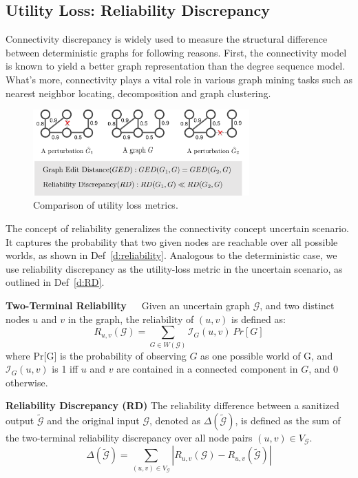 \subsection{Utility Loss: Reliability Discrepancy}

Connectivity discrepancy is widely used to measure the structural difference between deterministic graphs for following reasons. 
First, the connectivity model is known to yield a better graph representation than the degree sequence model. 
What's more, connectivity plays a vital role in various graph mining tasks such as nearest neighbor locating, decomposition and graph clustering. 
\begin{figure}[!htb]
  \centering
  \includegraphics[height=3.3cm]{ill/UL.pdf}
  \vspace{-4pt}
  \caption{Comparison of utility loss metrics.}
  \label{fig:utility_loss}
\end{figure} 

The concept of reliability generalizes the connectivity concept uncertain scenario. 
It captures the probability that two given nodes are reachable over all possible worlds, as shown in Def~\ref{d:reliability}. 
Analogous to the deterministic case, we use reliability discrepancy as the utility-loss metric in the uncertain scenario, as outlined in Def~\ref{d:RD}. 
\begin{definition}
    \textbf{Two-Terminal Reliability~\cite{Colbourn_Colbourn_1987}}~~Given an uncertain graph $\mathcal{G}$, and two distinct nodes $u$ and $v$ in the graph, the reliability of $(u,v)$ is defined as:
        \begin{equation*}
                R_{u,v}(\mathcal{G})= \sum_{G \in W(\mathcal{G})} \mathcal{I}_{G}(u,v) ~ Pr[G] 
        \end{equation*}
    where Pr[G] is the probability of observing $G$ as one possible world of G, and $\mathcal{I}_{G}(u,v)$ is 1 iff $u$ and $v$ are contained in a connected component in $G$, and 0 otherwise.   
    \label{d:reliability}
\end{definition}

\theoremstyle{definition}
\begin{definition}
    \textbf{Reliability Discrepancy (RD)}
    The reliability difference between a sanitized output $\tilde{\mathcal{G}}$ and the original input $\mathcal{G}$, 
    denoted as $\Delta(\tilde{\mathcal{G}})$, 
    is defined as the sum of the two-terminal reliability discrepancy over all node pairs $(u,v) \in V_\mathcal{G}$.
    \begin{equation*}
        \Delta(\tilde{\mathcal{G}})=\sum_{(u,v) \in V_\mathcal{G} }|R_{u,v}(\mathcal{G})-R_{u,v}(\tilde{\mathcal{G}})|
    \end{equation*}
    \label{d:RD}
\end{definition}

